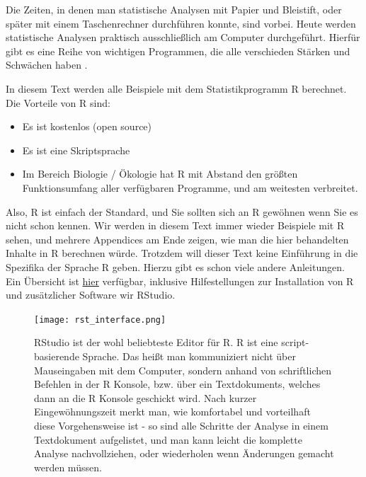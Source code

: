 \documentclass[a4paper,twoside]{tufte-book}\usepackage[]{graphicx}\usepackage[]{color}
\begin{document}
	Die Zeiten, in denen man statistische Analysen mit Papier und Bleistift, oder später mit einem Taschenrechner durchführen konnte, sind vorbei. Heute werden statistische Analysen praktisch ausschließlich am Computer durchgeführt. Hierfür gibt es eine Reihe von wichtigen Programmen, die alle verschieden Stärken und Schwächen haben .
	
	In diesem Text werden alle Beispiele mit dem Statistikprogramm R berechnet. Die Vorteile von R sind:
	
		\begin{itemize}
		\item Es ist kostenlos (open source)
		\item Es ist eine Skriptsprache 
		\item Im Bereich Biologie / Ökologie hat R mit Abstand den größten Funktionsumfang aller verfügbaren Programme, und am weitesten verbreitet. 
	\end{itemize}
	

Also, R ist einfach der Standard, und Sie sollten sich an R gewöhnen wenn Sie es nicht schon kennen. Wir werden in diesem Text immer wieder Beispiele mit R sehen, und mehrere Appendices am Ende zeigen, wie man die hier behandelten Inhalte in R berechnen würde. Trotzdem will dieser Text keine Einführung in die Spezifika der Sprache R geben. Hierzu gibt es schon viele andere Anleitungen. Ein Übersicht ist  \href{http://biometry.github.io/APES/R/R10-gettingStarted.html}{hier} verfügbar, inklusive Hilfestellungen zur Installation von R und zusätzlicher Software wir RStudio.
	
	\begin{figure}[]
		\begin{center}
			\texttt{[image: rst\_interface.png]}
			\caption{RStudio ist der wohl beliebteste Editor für R. R ist eine script-basierende Sprache. Das heißt man kommuniziert nicht über Mauseingaben mit dem Computer, sondern anhand von schriftlichen Befehlen in der R Konsole, bzw. über ein Textdokuments, welches dann an die R Konsole geschickt wird. Nach kurzer Eingewöhnungszeit merkt man, wie komfortabel und vorteilhaft diese Vorgehensweise ist - so sind alle Schritte der Analyse in einem Textdokument aufgelistet, und man kann leicht die komplette Analyse nachvollziehen, oder wiederholen wenn Änderungen gemacht werden müssen.}
			\label{fig: Rstudio1}
		\end{center}
	\end{figure}
	
\end{document}

